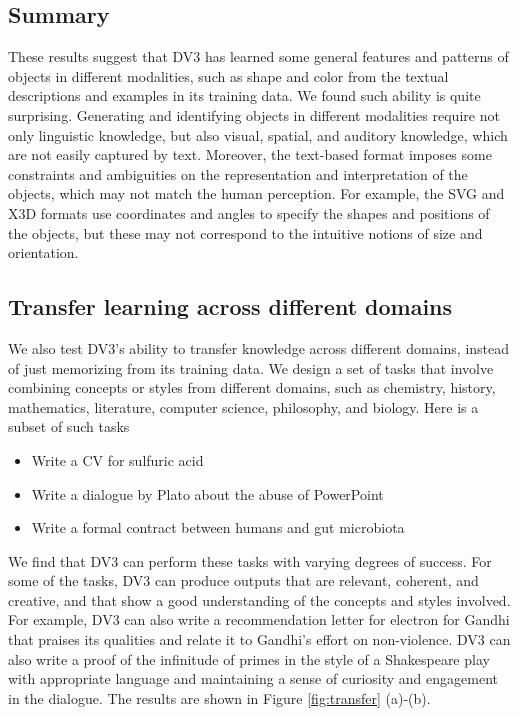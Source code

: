 \subsection{Summary}
These results suggest that DV3 has learned some general features and patterns of objects in different modalities, such as shape and color from the textual descriptions and examples in its training data. We found such ability is quite surprising. Generating and identifying objects in different modalities require not only linguistic knowledge, but also visual, spatial, and auditory knowledge, which are not easily captured by text. Moreover, the text-based format imposes some constraints and ambiguities on the representation and interpretation of the objects, which may not match the human perception. For example, the SVG and X3D formats use coordinates and angles to specify the shapes and positions of the objects, but these may not correspond to the intuitive notions of size and orientation.

\iffalse
\subsection{Transfer learning across different domains}
We also test DV3's ability to transfer knowledge across different domains, instead of just memorizing from its training data. We design a set of tasks that involve combining concepts or styles from different domains, such as chemistry, history, mathematics, literature, computer science, philosophy, and biology. Here is a subset of such tasks

\begin{itemize}
    \item Write a CV for sulfuric acid
    \item Write a dialogue by Plato about the abuse of PowerPoint
    \item Write a formal contract between humans and gut microbiota
\end{itemize}

We find that DV3 can perform these tasks with varying degrees of success. For some of the tasks, DV3 can produce outputs that are relevant, coherent, and creative, and that show a good understanding of the concepts and styles involved. For example, DV3 can also write a recommendation letter for electron for Gandhi that praises its qualities and relate it to Gandhi's effort on non-violence. DV3 can also write a proof of the infinitude of primes in the style of a Shakespeare play with appropriate language and maintaining a sense of curiosity and engagement in the dialogue. The results are shown in Figure \ref{fig:transfer} (a)-(b).

